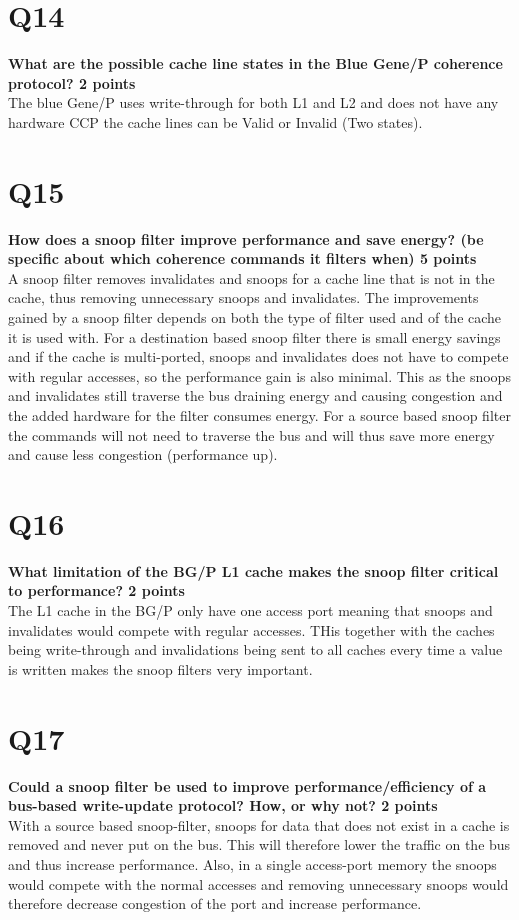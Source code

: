 \documentclass[a4paper]{article}
\begin{document}
\section*{Q14}
\large{\textbf{
What are the possible cache line states in the Blue Gene/P coherence protocol? 2 points\\}}
The blue Gene/P uses write-through for both L1 and L2 and does not have any hardware CCP the cache lines can be Valid or Invalid (Two states).

\section*{Q15}
\large{\textbf{
How does a snoop filter improve performance and save energy? (be specific about which coherence commands it filters when) 5 points\\}}
A snoop filter removes invalidates and snoops for a cache line that is not in the cache, thus removing unnecessary snoops and invalidates. The improvements gained by a snoop filter depends on both the type of filter used and of the cache it is used with. For a destination based snoop filter there is small energy savings and if the cache is multi-ported, snoops and invalidates does not have to compete with regular accesses, so the performance gain is also minimal. This as the snoops and invalidates still traverse the bus draining energy and causing congestion and the added hardware for the filter consumes energy. For a source based snoop filter the commands will not need to traverse the bus and will thus save more energy and cause less congestion (performance up).

\section*{Q16}
\large{\textbf{
What limitation of the BG/P L1 cache makes the snoop filter critical to performance? 2 points\\}}
The L1 cache in the BG/P only have one access port meaning that snoops and invalidates would compete with regular accesses. THis together with the caches being write-through and invalidations being sent to all caches every time a value is written makes the snoop filters very important.

\section*{Q17}
\large{\textbf{
Could a snoop filter be used to improve performance/efficiency of a bus-based write-update protocol? How, or why not? 2 points\\}}
With a source based snoop-filter, snoops for data that does not exist in a cache is removed and never put on the bus. This will therefore lower the traffic on the bus and thus increase performance. Also, in a single access-port memory the snoops would compete with the normal accesses and removing unnecessary snoops would therefore decrease congestion of the port and increase performance.
\end{document}
